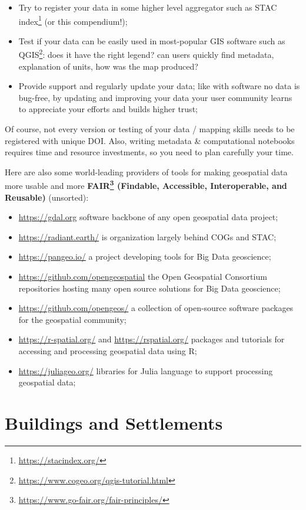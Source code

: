\documentclass[
  graybox,natbib,nospthms]{svmono}
\providecommand{\tightlist}{%
  \setlength{\itemsep}{0pt}\setlength{\parskip}{0pt}}
\providecommand{\tightlist}{\setlength{\itemsep}{0pt}\setlength{\parskip}{0pt}}
\renewcommand{\href}[2]{#2 (\url{#1})}
\renewcommand{\href}[2]{#2\footnote{\url{#1}}}
\begin{document}
\begin{itemize}
\item
  Try to register your data in some higher level aggregator such as \href{https://stacindex.org/}{STAC index} (or this compendium!);
\item
  Test if your data can be easily used in most-popular GIS software such as \href{https://www.cogeo.org/qgis-tutorial.html}{QGIS}: does it have the right legend? can users quickly find metadata, explanation of units, how was the map produced?
\item
  Provide support and regularly update your data; like with software no data is bug-free, by updating and improving your data your user community learns to appreciate your efforts and builds higher trust;
\end{itemize}

Of course, not every version or testing of your data / mapping skills
needs to be registered with unique DOI. Also, writing metadata \&
computational notebooks requires time and resource investments, so you
need to plan carefully your time.

Here are also some world-leading providers of tools for making geospatial
data more usable and more \textbf{\href{https://www.go-fair.org/fair-principles/}{FAIR} (Findable, Accessible, Interoperable, and Reusable)} (unsorted):

\begin{itemize}
\tightlist
\item
  \url{https://gdal.org} software backbone of any open geospatial data project;
\item
  \url{https://radiant.earth/} is organization largely behind COGs and STAC;
\item
  \url{https://pangeo.io/} a project developing tools for Big Data geoscience;
\item
  \url{https://github.com/opengeospatial} the Open Geospatial Consortium repositories hosting many open source solutions for Big Data geoscience;
\item
  \url{https://github.com/opengeos/} a collection of open-source software packages for the geospatial community;
\item
  \url{https://r-spatial.org/} and \url{https://rspatial.org/} packages and tutorials for accessing and processing geospatial data using R;
\item
  \url{https://juliageo.org/} libraries for Julia language to support processing geospatial data;
\end{itemize}

\hypertarget{buildings-and-settlements}{%
\section{Buildings and Settlements}\label{buildings-and-settlements}}
\end{document}
